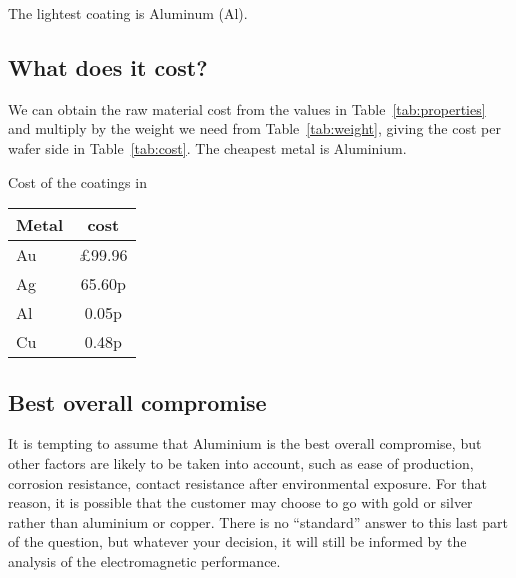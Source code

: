 \documentclass{tufte-handout}
\begin{document}
The lightest coating is Aluminum (Al).

\subsection{What does it cost?}
We can obtain the raw material cost from the values in Table~\ref{tab:properties} and multiply by the weight we need from Table~\ref{tab:weight}, giving the cost per wafer side in Table~\ref{tab:cost}. The cheapest metal is Aluminium.

\begin{margintable}
\caption{Cost of the coatings in  }
\centering
\begin{tabular}{|l|c|}
\hline 
Metal & cost \\
\hline
Au & £99.96 \\
Ag & 65.60p \\
Al &  0.05p\\
Cu & 0.48p \\
\hline
\end{tabular}
\label{tab:cost}
\end{margintable}

\subsection{Best overall compromise}
It is tempting to assume that Aluminium is the best overall compromise, but other factors are likely to be taken into account, such as ease of production, corrosion resistance, contact resistance after environmental exposure. For that reason, it is possible that the customer may choose to go with gold or silver rather than aluminium or copper. There is no ``standard'' answer to this last part of the question, but whatever your decision, it will still be informed by the analysis of the electromagnetic performance.
\end{document}
